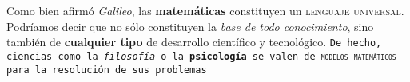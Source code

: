 \documentclass{article}
\begin{document}
Como bien afirmó \textit{Galileo}, las \textbf{matemáticas} constituyen un
\textsc{lenguaje universal}. \textsf{Podríamos decir que no sólo constituyen
la \textit{base de todo conocimiento}, sino también de \textbf{cualquier tipo}
de desarrollo científico y tecnológico}. \texttt{De hecho, ciencias como la
\textit{filosofía} o la \textbf{psicología} se valen de 
\textsc{modelos ma\-temáticos} para la resolución de sus problemas} 
\end{document}

